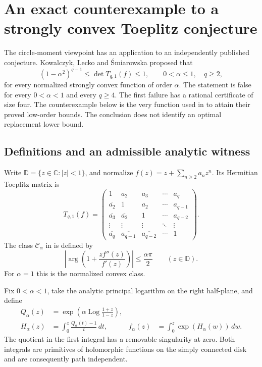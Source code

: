 \documentclass[11pt,a4paper]{article}
\numberwithin{equation}{section}
\theoremstyle{definition}\newtheorem{definition}[theorem]{Definition}
\theoremstyle{remark}\newtheorem{remark}[theorem]{Remark}
\begin{document}
\section{An exact counterexample to a strongly convex Toeplitz conjecture}
\label{sec:kls-counterexample}

The circle-moment viewpoint has an application to an independently
published conjecture.  Kowalczyk, Lecko and \'Smiarowska
\cite[Conjecture~1, p.~331]{KLS2021} proposed that
\begin{equation}
 (1-\alpha^2)^{q-1}\leq \det T_{q,1}(f)\leq1,
 \qquad 0<\alpha\leq1,\quad q\geq2,
 \label{eq:kls-original}
\end{equation}
for every normalized strongly convex function of order $\alpha$.
The statement is false for every $0<\alpha<1$ and every $q\geq4$.
The first failure has a rational certificate of size four.  The
counterexample below is the very function used in
\cite[Eq.~(21), p.~329]{KLS2021} to attain their proved low-order bounds.
The conclusion does not identify an optimal replacement lower bound.

\subsection{Definitions and an admissible analytic witness}

Write $\mathbb D=\{z\in\mathbb C:|z|<1\}$, and normalize
$f(z)=z+\sum_{n\geq2}a_nz^n$.  Its Hermitian Toeplitz matrix is
\[
 T_{q,1}(f)=
 \begin{pmatrix}
 1&a_2&a_3&\cdots&a_q\\
 \overline{a_2}&1&a_2&\cdots&a_{q-1}\\
 \overline{a_3}&\overline{a_2}&1&\cdots&a_{q-2}\\
 \vdots&\vdots&\vdots&\ddots&\vdots\\
 \overline{a_q}&\overline{a_{q-1}}&\overline{a_{q-2}}&\cdots&1
 \end{pmatrix}.
\]
The class $\mathcal C_\alpha$ in \cite{KLS2021} is defined by
\[
 \left|\arg\left(1+\frac{zf''(z)}{f'(z)}\right)\right|
 \leq\frac{\alpha\pi}{2}\qquad(z\in\mathbb D).
\]
For $\alpha=1$ this is the normalized convex class.

Fix $0<\alpha<1$, take the analytic principal logarithm on the right
half-plane, and define
\begin{align}
 Q_\alpha(z)&=
 \exp\left(\alpha\operatorname{Log}\frac{1+z}{1-z}\right),
 \label{eq:kls-Q}\\
 H_\alpha(z)&=\int_0^z\frac{Q_\alpha(t)-1}{t}\,dt,
 &f_\alpha(z)&=\int_0^z\exp(H_\alpha(w))\,dw.
 \label{eq:kls-witness}
\end{align}
The quotient in the first integral has a removable singularity at zero.
Both integrals are primitives of holomorphic functions on the simply
connected disk and are consequently path independent.
\end{document}
